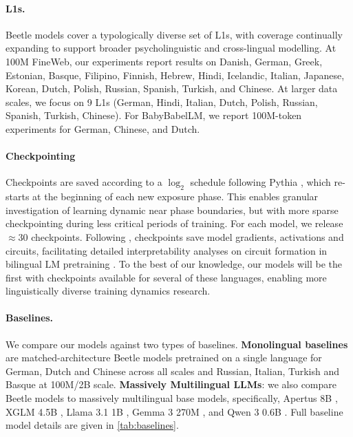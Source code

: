 \documentclass[11pt]{article}
\newcommand{\beetle}{Beetle} %
\begin{document}
\paragraph{L1s.}   \beetle{} models cover a typologically diverse set of L1s, with coverage continually expanding to support broader psycholinguistic and cross-lingual modelling. At 100M FineWeb, our experiments report results on Danish, German, Greek, Estonian, Basque, Filipino, Finnish, Hebrew, Hindi, Icelandic, Italian, Japanese, Korean, Dutch, Polish, Russian, Spanish, Turkish, and Chinese. At larger data scales, we focus on 9 L1s (German, Hindi, Italian, Dutch, Polish, Russian, Spanish, Turkish, Chinese). For BabyBabelLM, we report 100M-token experiments for German, Chinese, and Dutch.

\paragraph{Checkpointing}  Checkpoints are saved according to a $\log_2$ schedule following Pythia \citep{biderman2023pythia}, which re-starts at the beginning of each new exposure phase. This  enables granular investigation of learning dynamic near phase boundaries, but with more sparse checkpointing during less critical periods of training. For each model, we release $\approx30$ checkpoints. Following \citet{diehl-martinez-etal-2025-pico}, checkpoints save model gradients, activations and circuits, facilitating detailed interpretability analyses on circuit formation in bilingual LM pretraining \citep{inaba-etal-2025-bilingual}. 
To the best of our knowledge, our models will be the first with checkpoints available for several of these languages, enabling more linguistically diverse training dynamics research. %

\paragraph{Baselines.} We compare our models against two types of baselines.  \textbf{Monolingual baselines} are matched-architecture \beetle{} models pretrained on a single language for German, Dutch and Chinese across all scales and Russian, Italian, Turkish and Basque at 100M/2B scale.  
\textbf{Massively Multilingual LLMs}: we also compare \beetle{} models to massively multilingual base models, specifically,
Apertus 8B \citep{swiss-ai-2025-apertus}, XGLM 4.5B \citep{lin-etal-2022-shot}, Llama 3.1 1B \citep{grattafiori2024llama}, Gemma 3 270M \citep{gemmateam2025gemma3technicalreport}, and Qwen 3 0.6B \citep{yang2025qwen3}. Full baseline model details are given in \autoref{tab:baselines}.
\end{document}
